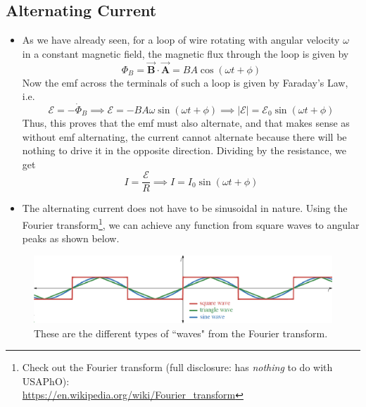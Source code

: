 \documentclass{scrartcl}
\begin{document}
    \subsection{Alternating Current}
    \begin{itemize}
        \item As we have already seen, for a loop of wire rotating with angular velocity $\omega$ in a constant magnetic field, the magnetic flux through the loop is given by \[\Phi_B=\vec{\mathbf B}\cdot\vec{\mathbf A}=BA\cos\left(\omega t+\phi\right)\] Now the emf across the terminals of such a loop is given by Faraday's Law, i.e. \[\mathcal E=-\dot\Phi_B\implies\boxed{\mathcal E=-BA\omega\sin\left(\omega t+\phi\right)}\implies|\mathcal E|=\mathcal E_0\sin\left(\omega t+\phi\right)\] Thus, this proves that the emf must also alternate, and that makes sense as without emf alternating, the current cannot alternate because there will be nothing to drive it in the opposite direction. Dividing by the resistance, we get \[I=\frac{\mathcal E}R\implies\boxed{I=I_0\sin\left(\omega t+\phi\right)}\]
        \item The alternating current does not have to be sinusoidal in nature. Using the Fourier transform\footnote[4]{Check out the Fourier transform (full disclosure: has \textit{nothing} to do with USAPhO):\\\url{https://en.wikipedia.org/wiki/Fourier_transform}}, we can achieve any function from square waves to angular peaks as shown below.
    \end{itemize}
    \begin{figure}[H]
        \centering
        \includegraphics[scale=.66]{fourier.eps}
        \caption{These are the different types of ``waves" from the Fourier transform.}
    \end{figure}
\end{document}

